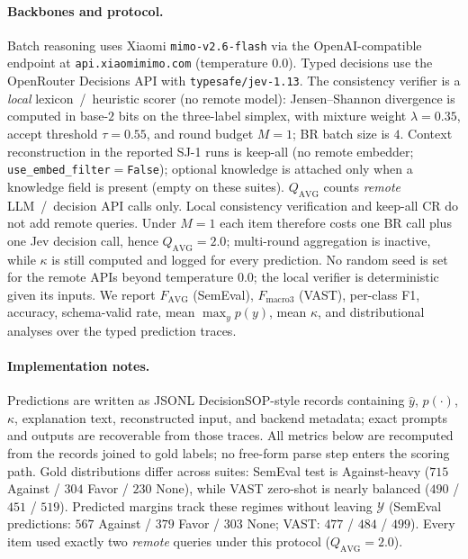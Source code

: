 \documentclass[10pt]{article}
\theoremstyle{definition}
\begin{document}
\paragraph{Backbones and protocol.}
Batch reasoning uses Xiaomi \texttt{mimo-v2.6-flash} via the OpenAI-compatible endpoint at
\texttt{api.xiaomimimo.com} (temperature $0.0$).
Typed decisions use the OpenRouter Decisions API with \texttt{typesafe/jev-1.13}.
The consistency verifier is a \emph{local} lexicon~/~heuristic scorer (no remote model): Jensen--Shannon
divergence is computed in base-$2$ bits on the three-label simplex, with mixture weight $\lambda{=}0.35$,
accept threshold $\tau{=}0.55$, and round budget $M{=}1$; BR batch size is $4$.
Context reconstruction in the reported SJ-1 runs is keep-all (no remote embedder;
\texttt{use\_embed\_filter}${}={}$\texttt{False}); optional knowledge is attached only when a knowledge field
is present (empty on these suites).
$Q_{\mathrm{AVG}}$ counts \emph{remote} LLM~/~decision API calls only.
Local consistency verification and keep-all CR do not add remote queries.
Under $M{=}1$ each item therefore costs one BR call plus one Jev decision call, hence
$Q_{\mathrm{AVG}}{=}2.0$; multi-round aggregation is inactive, while $\kappa$ is still computed and logged
for every prediction.
No random seed is set for the remote APIs beyond temperature $0.0$; the local verifier is deterministic given
its inputs.
We report $F_{\mathrm{AVG}}$ (SemEval), $F_{\mathrm{macro3}}$ (VAST), per-class F1, accuracy, schema-valid
rate, mean $\max_y p(y)$, mean $\kappa$, and distributional analyses over the typed prediction traces.

\paragraph{Implementation notes.}
Predictions are written as JSONL DecisionSOP-style records containing $\hat{y}$, $p(\cdot)$, $\kappa$,
explanation text, reconstructed input, and backend metadata; exact prompts and outputs are recoverable from
those traces.
All metrics below are recomputed from the records joined to gold labels; no free-form parse step enters the
scoring path.
Gold distributions differ across suites: SemEval test is Against-heavy ($715$ Against / $304$ Favor /
$230$ None), while VAST zero-shot is nearly balanced ($490$ / $451$ / $519$).
Predicted margins track these regimes without leaving $\mathcal{Y}$ (SemEval predictions:
$567$ Against / $379$ Favor / $303$ None; VAST: $477$ / $484$ / $499$).
Every item used exactly two \emph{remote} queries under this protocol ($Q_{\mathrm{AVG}}{=}2.0$).
\end{document}
